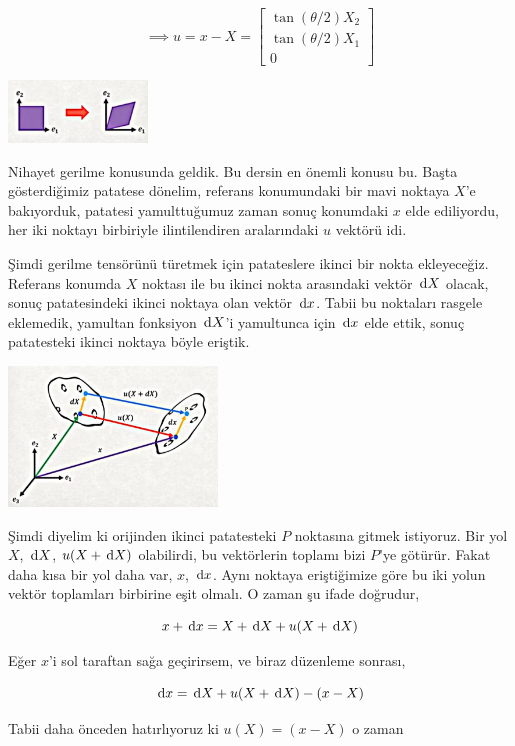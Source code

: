 \documentclass[12pt,fleqn]{article}\usepackage{../../common}
\begin{document}
$$
\implies u = x - X =
\left[\begin{array}{ccc}
\tan(\theta / 2) X_2 \\
\tan(\theta / 2) X_1 \\
0
\end{array}\right]
$$

\includegraphics[width=10em]{phy_020_strs_01_08.jpg}

Nihayet gerilme konusunda geldik. Bu dersin en önemli konusu bu. Başta
gösterdiğimiz patatese dönelim, referans konumundaki bir mavi noktaya $X$'e
bakıyorduk, patatesi yamulttuğumuz zaman sonuç konumdaki $x$ elde ediliyordu,
her iki noktayı birbiriyle ilintilendiren aralarındaki $u$ vektörü idi.

Şimdi gerilme tensörünü türetmek için patateslere ikinci bir nokta
ekleyeceğiz. Referans konumda $X$ noktası ile bu ikinci nokta arasındaki vektör
$\,\mathrm{d} X$ olacak, sonuç patatesindeki ikinci noktaya olan vektör $\,\mathrm{d} x$.  Tabii
bu noktaları rasgele eklemedik, yamultan fonksiyon $\,\mathrm{d} X$'i yamultunca için
$\,\mathrm{d} x$ elde ettik, sonuç patatesteki ikinci noktaya böyle eriştik.

\includegraphics[width=15em]{phy_020_strs_01_09.jpg}

Şimdi diyelim ki orijinden ikinci patatesteki $P$ noktasına gitmek
istiyoruz. Bir yol $X$, $\,\mathrm{d} X$, $u(X+\,\mathrm{d} X)$ olabilirdi, bu vektörlerin toplamı
bizi $P$'ye götürür. Fakat daha kısa bir yol daha var, $x$, $\,\mathrm{d} x$. Aynı
noktaya eriştiğimize göre bu iki yolun vektör toplamları birbirine eşit olmalı.
O zaman şu ifade doğrudur,

$$
x + \,\mathrm{d} x = X + \,\mathrm{d} X + u(X+\,\mathrm{d} X)
$$

Eğer $x$'i sol taraftan sağa geçirirsem, ve biraz düzenleme sonrası,

$$
\,\mathrm{d} x = \,\mathrm{d} X + u(X+\,\mathrm{d} X) - (x - X)
$$

Tabii daha önceden hatırlıyoruz ki $u(X) = (x - X)$ o zaman 
\end{document}
